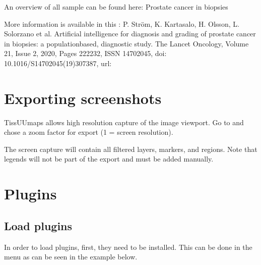 \documentclass[letterpaper,10pt,english,openany,oneside]{sphinxmanual}
\begin{document}
\sphinxAtStartPar
{}

\sphinxAtStartPar
An overview of all sample  can be found here: Prostate cancer in biopsies 

\sphinxAtStartPar
More information is available in this : P. Ström, K. Kartasalo, H. Olsson, L. Solorzano et al. Artificial intelligence for diagnosis and grading of prostate cancer in biopsies: a population\sphinxhyphen{}based, diagnostic study. The Lancet Oncology, Volume 21, Issue 2, 2020, Pages 222\sphinxhyphen{}232, ISSN 1470\sphinxhyphen{}2045,  doi: 10.1016/S1470\sphinxhyphen{}2045(19)30738\sphinxhyphen{}7, url: 

\sphinxstepscope


\section{Exporting screenshots}
\label{\detokenize{docs/starting/capture:exporting-screenshots}}\label{\detokenize{docs/starting/capture::doc}}
\sphinxAtStartPar
TissUUmaps allows high resolution capture of the image viewport. Go to  and chose a zoom factor for export (1 = screen resolution).

\sphinxAtStartPar
The screen capture will contain all filtered layers, markers, and regions. Note that legends will not be part of the export and must be added manually.

\sphinxstepscope


\section{Plugins}
\label{\detokenize{docs/starting/plugins:plugins}}\label{\detokenize{docs/starting/plugins::doc}}

\subsection{Load plugins}
\label{\detokenize{docs/starting/plugins:load-plugins}}
\sphinxAtStartPar
In order to load plugins, first, they need to be installed. This can be done in the menu  as can be seen in the example below.
\end{document}
